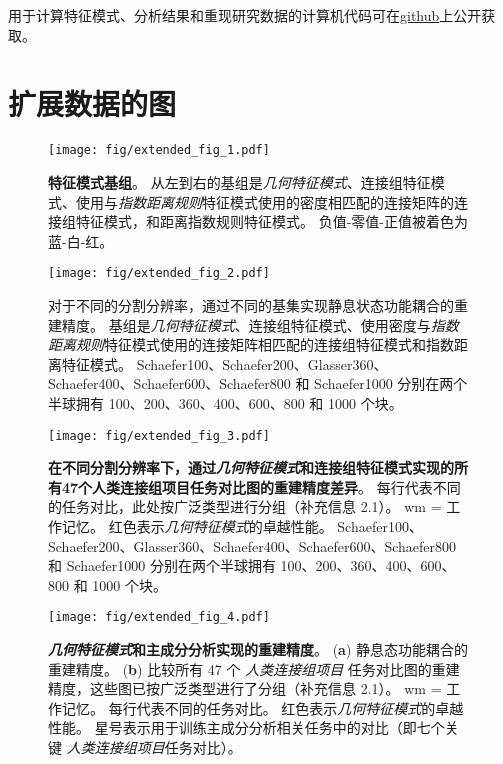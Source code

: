 \documentclass[lang=cn,a4paper,newtx,citestyle=gb7714-2015, bibstyle=gb7714-2015]{elegantpaper}
\begin{document}
用于计算特征模式、分析结果和重现研究数据的计算机代码可在\href{https://github.com/NSBLab/BrainEigenmodes}{github}上公开获取。



\section{扩展数据的图}


\begin{figure}[!htb] 
	\centering
	\texttt{[image: fig/extended\_fig\_1.pdf]}
	\caption{\textbf{特征模式基组}。
		从左到右的基组是\textit{几何特征模式}、连接组特征模式、使用与\textit{指数距离规则}特征模式使用的密度相匹配的连接矩阵的连接组特征模式，和距离指数规则特征模式。 
		负值-零值-正值被着色为蓝-白-红。
	} \label{fig:extended_fig_1}
\end{figure}


\begin{figure}[!htb] 
	\centering
	\texttt{[image: fig/extended\_fig\_2.pdf]}
	\caption{对于不同的分割分辨率，通过不同的基集实现静息状态功能耦合的重建精度。 
		基组是\textit{几何特征模式}、连接组特征模式、使用密度与\textit{指数距离规则}特征模式使用的连接矩阵相匹配的连接组特征模式和指数距离特征模式。
		Schaefer100、Schaefer200、Glasser360、Schaefer400、Schaefer600、Schaefer800 和 Schaefer1000 分别在两个半球拥有 100、200、360、400、600、800 和 1000 个块。
	} \label{fig:extended_fig_2}
\end{figure}


\begin{figure}[!htb] 
	\centering
	\texttt{[image: fig/extended\_fig\_3.pdf]}
	\caption{\textbf{在不同分割分辨率下，通过\textit{几何特征模式}和连接组特征模式实现的所有47个人类连接组项目任务对比图的重建精度差异}。
	每行代表不同的任务对比，此处按广泛类型进行分组（补充信息 2.1）。
	wm = 工作记忆。
	红色表示\textit{几何特征模式}的卓越性能。
	Schaefer100、Schaefer200、Glasser360、Schaefer400、Schaefer600、Schaefer800 和 Schaefer1000 分别在两个半球拥有 100、200、360、400、600、800 和 1000 个块。}
	\label{fig:extended_fig_3}
\end{figure}


\begin{figure}[!htb] 
	\centering
	\texttt{[image: fig/extended\_fig\_4.pdf]}
	\caption{\textbf{\textit{几何特征模式}和主成分分析实现的重建精度}。
	(\textbf{a}) 静息态功能耦合的重建精度。
	(\textbf{b}) 比较所有 47 个 \textit{人类连接组项目} 任务对比图的重建精度，这些图已按广泛类型进行了分组（补充信息 2.1）。
	wm = 工作记忆。
	每行代表不同的任务对比。
	红色表示\textit{几何特征模式}的卓越性能。
	星号表示用于训练主成分分析相关任务中的对比（即七个关键 \textit{人类连接组项目}任务对比）。}
	\label{fig:extended_fig_4}
\end{figure}
\end{document}
